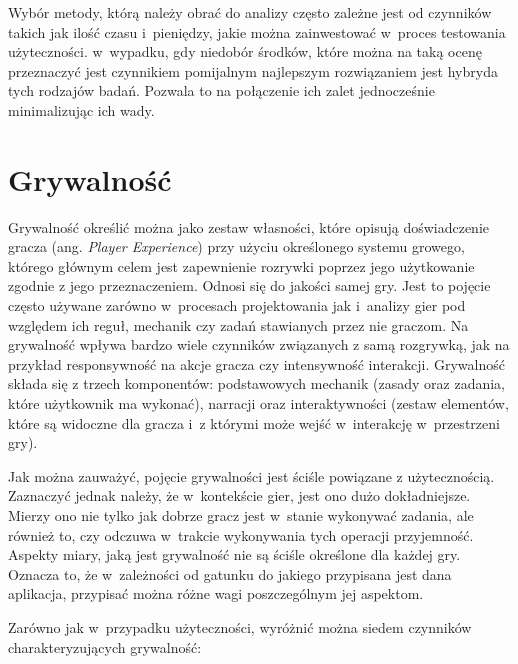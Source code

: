 \documentclass[a4paper,12pt,numbers=noenddot]{report}
\begin{document}
Wybór metody, którą należy obrać do analizy często zależne jest od czynników takich jak ilość czasu i~pieniędzy, jakie można zainwestować w~proces testowania użyteczności. w~wypadku, gdy niedobór środków, które można na taką ocenę przeznaczyć jest czynnikiem pomijalnym najlepszym rozwiązaniem jest hybryda tych rodzajów badań. Pozwala to na połączenie ich zalet jednocześnie minimalizując ich wady.

\section{Grywalność}
Grywalność określić można jako zestaw własności, które opisują doświadczenie gracza (ang. \textit{Player Experience}) przy użyciu określonego systemu growego, którego głównym celem jest zapewnienie rozrywki poprzez jego użytkowanie zgodnie z jego przeznaczeniem. \cite{art_Playability} Odnosi się do jakości samej gry. Jest to pojęcie często używane zarówno w~procesach projektowania jak i~analizy gier pod względem ich reguł, mechanik czy zadań stawianych przez nie graczom. Na grywalność wpływa bardzo wiele czynników związanych z samą rozgrywką, jak na przykład responsywność na akcje gracza czy intensywność interakcji.
Grywalność składa się z trzech komponentów: podstawowych mechanik (zasady oraz zadania, które użytkownik ma wykonać), narracji oraz interaktywności (zestaw elementów, które są widoczne dla gracza i~z którymi może wejść w~interakcję w~przestrzeni gry). \cite{art_UserExperience}

Jak można zauważyć, pojęcie grywalności jest ściśle powiązane z użytecznością. Zaznaczyć jednak należy, że w~kontekście gier, jest ono dużo dokładniejsze. Mierzy ono nie tylko jak dobrze gracz jest w~stanie wykonywać zadania, ale również to, czy odczuwa w~trakcie wykonywania tych operacji przyjemność. Aspekty miary, jaką jest grywalność nie są ściśle określone dla każdej gry. Oznacza to, że w~zależności od gatunku do jakiego przypisana jest dana aplikacja, przypisać można różne wagi poszczególnym jej aspektom.

Zarówno jak w~przypadku użyteczności, wyróżnić można siedem czynników charakteryzujących grywalność:
\end{document}
